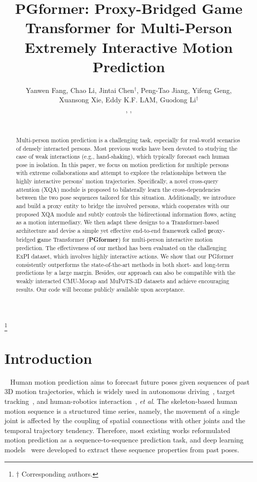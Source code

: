 \documentclass[10pt,twocolumn,letterpaper]{article}
\title{PGformer: Proxy-Bridged Game Transformer for Multi-Person \\ Extremely Interactive Motion Prediction}
\author{\vspace{-1.0em}
Yanwen Fang\affmark[1,2], 
Chao Li\affmark[2], 
Jintai Chen$^{\dagger}$\affmark[3], 
Peng-Tao Jiang\affmark[3], 
Yifeng Geng\affmark[2], \\
\vspace{-0.8em}
Xuansong Xie\affmark[2], 
Eddy K.F. LAM\affmark[1], 
Guodong Li$^{\dagger}$\affmark[1] \\
\vspace{0.5em}
\affaddr{\affmark[1]The University of Hong Kong},
\affaddr{\affmark[2]DAMO Academy, Alibaba}, 
\affaddr{\affmark[3]Zhejiang University} \\
\small
 \email{u3545683@connect.hku.hk, lllcho.lc@alibaba-inc.com, jtigerchen@zju.edu.cn, pt.jiang@mail.nankai.edu.cn, gengyifeng@gmail.com, xingtong.xxs@taobao.com, hrntlkf@hku.hk, gdli@hku.hk} \\
}
\newcommand\nnfootnote[1]{\begin{NoHyper}
  \renewcommand\thefootnote{}\footnote{#1}\addtocounter{footnote}{-1}\end{NoHyper}
}
\begin{document}
\maketitle
\nnfootnote{$\dagger$ Corresponding authors.}
\ificcvfinal\thispagestyle{empty}\fi

\vspace{-2em}
\begin{abstract}
Multi-person motion prediction is a challenging task, especially for real-world scenarios of densely interacted persons. 
Most previous works have been devoted to studying the case of weak interactions (e.g., hand-shaking), which typically forecast each human pose in isolation.
In this paper, we focus on motion prediction for multiple persons with extreme collaborations and attempt to explore the relationships between the highly interactive persons' motion trajectories. 
Specifically, a novel cross-query attention (XQA) module is proposed to bilaterally learn the cross-dependencies between the two pose sequences tailored for this situation. 
Additionally, we introduce and build a proxy entity to bridge the involved persons, which cooperates with our proposed XQA module and subtly controls the bidirectional information flows, acting as a motion intermediary. 
We then adapt these designs to a Transformer-based architecture and devise a simple yet effective end-to-end framework called \textbf{p}roxy-bridged \textbf{g}ame Transformer (\textbf{PGformer}) for multi-person interactive motion prediction.
The effectiveness of our method has been evaluated on the challenging ExPI dataset, which involves highly interactive actions. 
We show that our PGformer consistently outperforms the state-of-the-art methods in both short- and long-term predictions by a large margin. 
Besides, our approach can also be compatible with the weakly interacted CMU-Mocap and MuPoTS-3D datasets and achieve encouraging results. 
Our code will become publicly available upon acceptance. 
\end{abstract}


\section{Introduction} 
~\label{sec:intro}
Human motion prediction aims to forecast future poses given sequences of past 3D motion trajectories, 
which is widely used in autonomous driving~\cite{djuric2020uncertainty,akbari2017automatic}, target tracking~\cite{6126296}, and human-robotics interaction~\cite{Koppula2013AnticipatingHA, butepage2018anticipating}, \textit{et al}.
The skeleton-based human motion sequence is a structured time series, namely, the movement of a single joint is affected by the coupling of spatial connections with other joints and the temporal trajectory tendency.
Therefore, most existing works reformulated motion prediction as a sequence-to-sequence prediction task, and deep learning models~\cite{julieta2017motion, Aksan_2019_ICCV, Martinez_potr_ICCV2021, 9665904, Zhong2022SpatioTemporalGG, sofianos2021spacetimeseparable} were developed to extract these sequence properties from past poses.
\end{document}
